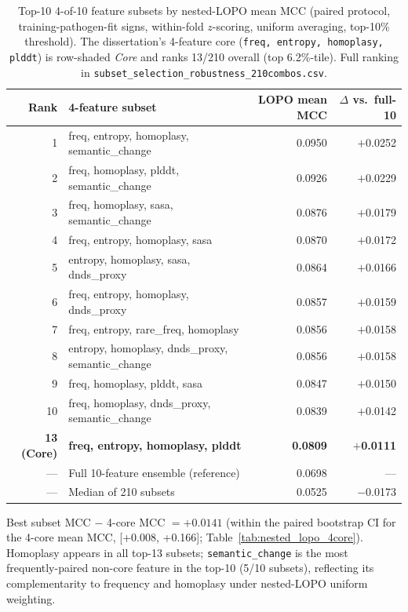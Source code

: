 \begin{table}[htbp]
\centering
\caption{Top-10 4-of-10 feature subsets by nested-LOPO mean MCC (paired protocol, training-pathogen-fit signs, within-fold $z$-scoring, uniform averaging, top-10\% threshold). The dissertation's 4-feature core (\texttt{freq, entropy, homoplasy, plddt}) is row-shaded \emph{Core} and ranks 13/210 overall (top 6.2\%-tile). Full ranking in \texttt{subset\_selection\_robustness\_210combos.csv}.}
\label{tab:subset_selection_top10}
\footnotesize
\begin{tabular}{rlrr}
\toprule
\textbf{Rank} & \textbf{4-feature subset} & \textbf{LOPO mean MCC} & \textbf{$\Delta$ vs.\ full-10} \\
\midrule
1  & freq, entropy, homoplasy, semantic\_change & 0.0950 & $+$0.0252 \\
2  & freq, homoplasy, plddt, semantic\_change   & 0.0926 & $+$0.0229 \\
3  & freq, homoplasy, sasa, semantic\_change    & 0.0876 & $+$0.0179 \\
4  & freq, entropy, homoplasy, sasa             & 0.0870 & $+$0.0172 \\
5  & entropy, homoplasy, sasa, dnds\_proxy      & 0.0864 & $+$0.0166 \\
6  & freq, entropy, homoplasy, dnds\_proxy      & 0.0857 & $+$0.0159 \\
7  & freq, entropy, rare\_freq, homoplasy       & 0.0856 & $+$0.0158 \\
8  & entropy, homoplasy, dnds\_proxy, semantic\_change & 0.0856 & $+$0.0158 \\
9  & freq, homoplasy, plddt, sasa               & 0.0847 & $+$0.0150 \\
10 & freq, homoplasy, dnds\_proxy, semantic\_change & 0.0839 & $+$0.0142 \\
\midrule
\textbf{13 (Core)} & \textbf{freq, entropy, homoplasy, plddt} & \textbf{0.0809} & \textbf{$+$0.0111} \\
\midrule
--- & Full 10-feature ensemble (reference) & 0.0698 & --- \\
--- & Median of 210 subsets & 0.0525 & $-$0.0173 \\
\bottomrule
\end{tabular}
\begin{minipage}{\textwidth}
\smallskip
\footnotesize Best subset MCC $-$ 4-core MCC $= +0.0141$ (within the paired bootstrap CI for the 4-core mean MCC, [+0.008, +0.166]; Table~\ref{tab:nested_lopo_4core}). Homoplasy appears in all top-13 subsets; \texttt{semantic\_change} is the most frequently-paired non-core feature in the top-10 (5/10 subsets), reflecting its complementarity to frequency and homoplasy under nested-LOPO uniform weighting.
\end{minipage}
\end{table}


